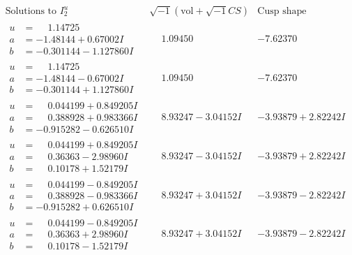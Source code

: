 \documentclass[1p]{elsarticle_modified}
\theoremstyle{definition}
\newcommand{\I}{\sqrt{-1}}
\begin{document}
$$\begin{array}{c|c|c}  
\text{Solutions to }I^u_{2}& \I (\text{vol} + \sqrt{-1}CS) & \text{Cusp shape}\\
 \hline 
\begin{aligned}
u &= \phantom{-}1.14725\phantom{ +0.000000I} \\
a &= -1.48144 + 0.67002 I \\
b &= -0.301144 - 1.127860 I\end{aligned}
 & \phantom{-}1.09450\phantom{ +0.000000I} & -7.62370\phantom{ +0.000000I} \\ \hline\begin{aligned}
u &= \phantom{-}1.14725\phantom{ +0.000000I} \\
a &= -1.48144 - 0.67002 I \\
b &= -0.301144 + 1.127860 I\end{aligned}
 & \phantom{-}1.09450\phantom{ +0.000000I} & -7.62370\phantom{ +0.000000I} \\ \hline\begin{aligned}
u &= \phantom{-}0.044199 + 0.849205 I \\
a &= \phantom{-}0.388928 + 0.983366 I \\
b &= -0.915282 - 0.626510 I\end{aligned}
 & \phantom{-}8.93247 - 3.04152 I & -3.93879 + 2.82242 I \\ \hline\begin{aligned}
u &= \phantom{-}0.044199 + 0.849205 I \\
a &= \phantom{-}0.36363 - 2.98960 I \\
b &= \phantom{-}0.10178 + 1.52179 I\end{aligned}
 & \phantom{-}8.93247 - 3.04152 I & -3.93879 + 2.82242 I \\ \hline\begin{aligned}
u &= \phantom{-}0.044199 - 0.849205 I \\
a &= \phantom{-}0.388928 - 0.983366 I \\
b &= -0.915282 + 0.626510 I\end{aligned}
 & \phantom{-}8.93247 + 3.04152 I & -3.93879 - 2.82242 I \\ \hline\begin{aligned}
u &= \phantom{-}0.044199 - 0.849205 I \\
a &= \phantom{-}0.36363 + 2.98960 I \\
b &= \phantom{-}0.10178 - 1.52179 I\end{aligned}
 & \phantom{-}8.93247 + 3.04152 I & -3.93879 - 2.82242 I \\ \hline\begin{aligned}

\end{aligned}
\end{array}$$
\end{document}
